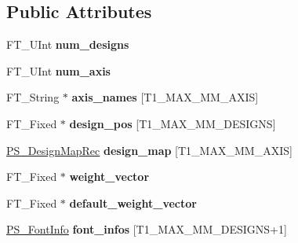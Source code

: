 \subsection*{Public Attributes}
\begin{DoxyCompactItemize}
\item 
\mbox{\label{structPS__BlendRec___ad81cbf3697f89908e9c15071e2ab9cac}} 
F\+T\+\_\+\+U\+Int {\bfseries num\+\_\+designs}
\item 
\mbox{\label{structPS__BlendRec___af9b375493ee2d450cabbc571473e4006}} 
F\+T\+\_\+\+U\+Int {\bfseries num\+\_\+axis}
\item 
\mbox{\label{structPS__BlendRec___ac675577017b5e7c5ac299cb189767a4c}} 
F\+T\+\_\+\+String $\ast$ {\bfseries axis\+\_\+names} \mbox{[}T1\+\_\+\+M\+A\+X\+\_\+\+M\+M\+\_\+\+A\+X\+IS\mbox{]}
\item 
\mbox{\label{structPS__BlendRec___ab794b6a3a2191c061d0386c37b6f43c0}} 
F\+T\+\_\+\+Fixed $\ast$ {\bfseries design\+\_\+pos} \mbox{[}T1\+\_\+\+M\+A\+X\+\_\+\+M\+M\+\_\+\+D\+E\+S\+I\+G\+NS\mbox{]}
\item 
\mbox{\label{structPS__BlendRec___a62bfef988f08838908d93b64df139295}} 
\hyperlink{structPS__DesignMap__}{P\+S\+\_\+\+Design\+Map\+Rec} {\bfseries design\+\_\+map} \mbox{[}T1\+\_\+\+M\+A\+X\+\_\+\+M\+M\+\_\+\+A\+X\+IS\mbox{]}
\item 
\mbox{\label{structPS__BlendRec___a388a7d7034a19dd7e9d8dbdccbb1f02f}} 
F\+T\+\_\+\+Fixed $\ast$ {\bfseries weight\+\_\+vector}
\item 
\mbox{\label{structPS__BlendRec___afe57706b47703e0ce992c518eb43cb2d}} 
F\+T\+\_\+\+Fixed $\ast$ {\bfseries default\+\_\+weight\+\_\+vector}
\item 
\mbox{\label{structPS__BlendRec___ae304c5d1ef6ad7aa58331238f2d96aca}} 
\hyperlink{structPS__FontInfoRec__}{P\+S\+\_\+\+Font\+Info} {\bfseries font\+\_\+infos} \mbox{[}T1\+\_\+\+M\+A\+X\+\_\+\+M\+M\+\_\+\+D\+E\+S\+I\+G\+NS+1\mbox{]}
\item 
\mbox{\label{structPS__BlendRec___a21bc24c4ace0c660e8eff2707dc3133e}} 

\end{DoxyCompactItemize}
